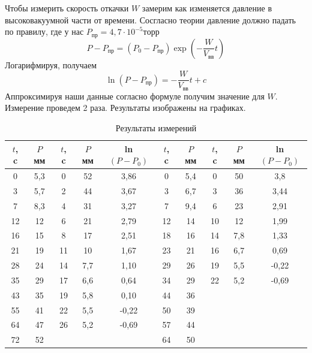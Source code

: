 \documentclass[a4paper,12pt]{article}
\begin{document}
    Чтобы измерить скорость откачки $W$ замерим как изменяется давление в высоковакуумной части от времени. Сосгласно теории давление должно падать по правилу, где у нас $P_{пр}=4,7\cdot10^{-5}торр$
    \begin{equation}
        P-P_{пр}=(P_0 - P_{пр})\exp\left(-\frac{W}{V_{вв}}t\right)
    \end{equation}
    Логарифмируя, получаем
    \begin{equation}
        \ln(P-P_{пр})=-\frac{W}{V_{вв}}t + c
    \end{equation}
    Аппроксимируя наши данные согласно формуле получим значение для $W$. Измерение проведем 2 раза. Результаты изображены на графиках.


    \begin{table}[!ht]
        \centering
        \begin{tabular}{|c|c|c|c|c|c|c|c|c|c|}
        \hline
            $t$, c & $P$ мм & $t$, c & $P$ мм & ln$(P-P_0)$ & $t$, c & $P$ мм &  $t$, c & $P$ мм & ln$(P-P_0)$ \\ \hline
            0 & 5,3 & 0 & 52 & 3,86 & 0 & 5,4 & 0 & 50 & 3,8 \\ \hline
            3 & 5,7 & 2 & 44 & 3,67 & 3 & 6,7 & 3 & 36 & 3,44 \\ \hline
            7 & 8,3 & 4 & 31 & 3,27 & 7 & 9,4 & 6 & 23 & 2,91 \\ \hline
            12 & 12 & 6 & 21 & 2,79 & 12 & 14 & 10 & 12 & 1,99 \\ \hline
            16 & 15 & 8 & 17 & 2,51 & 18 & 16 & 14 & 7,8 & 1,33 \\ \hline
            21 & 19 & 11 & 10 & 1,67 & 23 & 21 & 16 & 6,7 & 0,69 \\ \hline
            28 & 24 & 14 & 7,7 & 1,10 & 29 & 26 & 19 & 5,5 & -0,22 \\ \hline
            35 & 29 & 17 & 6,6 & 0,64 & 34 & 29 & 22 & 5,2 & -0,69 \\ \hline
            43 & 35 & 19 & 5,8 & 0,10 & 44 & 36 & ~ & ~ & ~ \\ \hline
            55 & 41 & 22 & 5,5 & -0,22 & 50 & 39 & ~ & ~ & ~ \\ \hline
            64 & 47 & 26 & 5,2 & -0,69 & 57 & 44 & ~ & ~ & ~ \\ \hline
            72 & 52 & ~ & ~ & ~ & 64 & 50 \\ \hline
        \end{tabular}
        \caption{Результаты измерений}
    \end{table}
\end{document}
